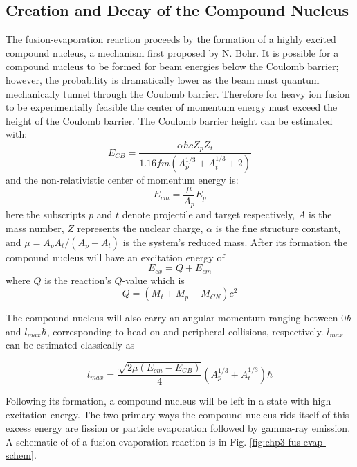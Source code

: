 \subsection{Creation and Decay of the Compound Nucleus}
\label{ssec:exp-pr-fus-evap-cn}
The fusion-evaporation reaction proceeds by the formation of a highly excited compound nucleus, a mechanism first proposed by N. Bohr\cite{bohr1936neutron}. It is possible for a compound nucleus to be formed for beam energies below the Coulomb barrier; however, the probability is dramatically lower as the beam must quantum mechanically tunnel through the Coulomb barrier. Therefore for heavy ion fusion to be experimentally feasible the center of momentum energy must exceed the height of the Coulomb barrier. The Coulomb barrier height can be estimated with:
\begin{equation}
\label{eqn:chp3-cb_en}
E_{CB}=\frac{\alpha \hbar c Z_p Z_t}{1.16 fm (A_p^{1/3} + A_t^{1/3} + 2)}
\end{equation}
and the non-relativistic center of momentum energy is:
\begin{equation}
\label{eqn:chp3-cmf_en}
E_{cm} = \frac{\mu}{A_{p}}E_{p}
\end{equation}
here the subscripts $p$ and $t$ denote projectile and target respectively, $A$ is the mass number, $Z$ represents the nuclear charge, $\alpha{}$ is the fine structure constant, and $\mu = A_{p}A_{t}/(A_{p}+A_{t})$ is the system's reduced mass. After its formation the compound nucleus will have an excitation energy of
\begin{equation}
\label{eqn:chp3-cn_ex}
E_{ex} = Q + E_{cm}
\end{equation}
where $Q$ is the reaction's $Q$-value which is
\begin{equation}
\label{eqn:chp3-cn_form_qvalue}
Q = (M_t+M_p-M_{CN})c^2
\end{equation}

The compound nucleus will also carry an angular momentum ranging between $0 \hbar$ and $l_{max} \hbar$, corresponding to head on and peripheral collisions, respectively. $l_{max}$ can be estimated classically as

\begin{equation}
\label{eqn:chp3-cn_lmax}
l_{max} = \frac{\sqrt{2\mu(E_{cm}-E_{CB})}}{4}(A^{1/3}_p + A^{1/3}_t)\hbar
\end{equation}

Following its formation, a compound nucleus will be left in a state with high excitation energy. The two primary ways the compound nucleus rids itself of this excess energy are fission\cite{fastFission} or particle evaporation followed by gamma-ray emission. A schematic of of a fusion-evaporation reaction is in Fig. \ref{fig:chp3-fus-evap-schem}.

